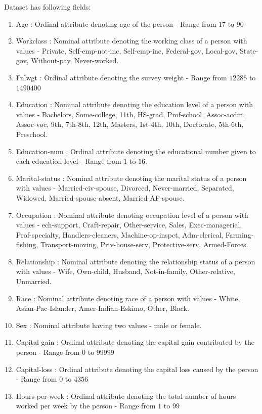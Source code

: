 \documentclass{article}
\begin{document}
Dataset has following fields:
\begin{enumerate}
   \item Age            : Ordinal attribute denoting age of the person - Range from $17$ to $90$
     \item Workclass  : Nominal attribute denoting the working class of a person with values - Private, Self-emp-not-inc, Self-emp-inc, Federal-gov, Local-gov, State-gov, Without-pay, Never-worked.
   \item Fnlwgt        : Ordinal attribute denoting the survey weight - Range from $12285$ to $1490400$
   \item Education  :  Nominal attribute denoting the education level of a person with values - Bachelors, Some-college, 11th, HS-grad, Prof-school, Assoc-acdm, Assoc-voc, 9th, 7th-8th, 12th, Masters, 1st-4th, 10th, Doctorate, 5th-6th, Preschool. 
   \item Education-num : Ordinal attribute denoting the educational number given to each education level - Range from $1$ to $16$.
   \item Marital-status : Nominal attribute denoting the marital status of a person with values - Married-civ-spouse, Divorced, Never-married, Separated, Widowed, Married-spouse-absent, Married-AF-spouse.
   \item Occupation : Nominal attribute denoting occupation level of a person with values - ech-support, Craft-repair, Other-service, Sales, Exec-managerial, Prof-specialty, Handlers-cleaners, Machine-op-inspct, Adm-clerical, Farming-fishing, Transport-moving, 
   Priv-house-serv, Protective-serv, Armed-Forces. 
   \item Relationship : Nominal attribute denoting the relationship status of a person with values - Wife, Own-child, Husband, Not-in-family, Other-relative, Unmarried. 
   \item Race : Nominal attribute denoting race of a person with values - White, Asian-Pac-Islander, Amer-Indian-Eskimo, Other, Black. 
   \item Sex : Nominal attribute having two values - male or female.
   \item Capital-gain : Ordinal attribute denoting the capital gain contributed by the person - Range from $0$ to $99999$
   \item Capital-loss : Ordinal attribute denoting the capital loss caused by the person - Range from $0$ to $4356$
   \item Hours-per-week : Ordinal attribute denoting the total number of hours worked per week by the person - Range from $1$ to $99$

\end{enumerate}
\end{document}
